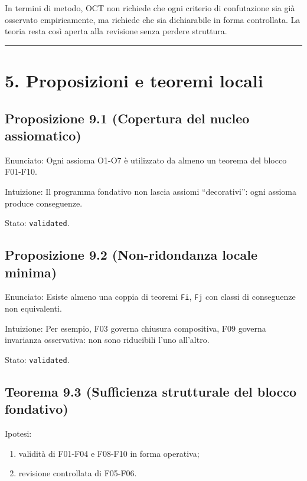 In termini di metodo, OCT non richiede che ogni criterio di confutazione sia già osservato empiricamente, ma richiede che sia dichiarabile in forma controllata. La teoria resta così aperta alla revisione senza perdere struttura.

\begin{center}\rule{0.5\linewidth}{0.5pt}\end{center}

\section{5. Proposizioni e teoremi locali}

\subsection{Proposizione 9.1 (Copertura del nucleo assiomatico)}

Enunciato:
Ogni assioma O1-O7 è utilizzato da almeno un teorema del blocco F01-F10.

Intuizione:
Il programma fondativo non lascia assiomi ``decorativi'': ogni assioma produce conseguenze.

Stato: \texttt{validated}.

\subsection{Proposizione 9.2 (Non-ridondanza locale minima)}

Enunciato:
Esiste almeno una coppia di teoremi \texttt{Fi}, \texttt{Fj} con classi di conseguenze non equivalenti.

Intuizione:
Per esempio, F03 governa chiusura compositiva, F09 governa invarianza osservativa: non sono riducibili l'uno all'altro.

Stato: \texttt{validated}.

\subsection{Teorema 9.3 (Sufficienza strutturale del blocco fondativo)}

Ipotesi:

\begin{enumerate}
\def\labelenumi{\arabic{enumi}.}
\tightlist
\item
  validità di F01-F04 e F08-F10 in forma operativa;
\item
  revisione controllata di F05-F06.
\end{enumerate}

